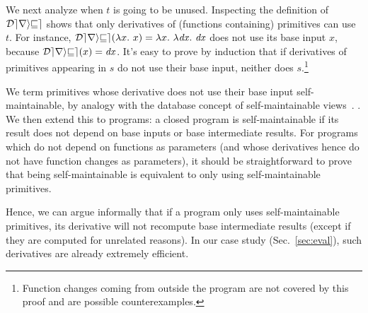 \begin{oldSec} %
We next analyze when $t$ is going to be unused.
Inspecting the definition of $\mathcal{Derive}$ shows that only derivatives of (functions
containing) primitives can use $t$. For instance,
$\Derive{\Lam{x}{x}} = \Lam{x}{\Lam{\D x}{\D x}}$ does not use its
base input $x$, because $\Derive{x} = \D x$.
It's easy to prove
by induction that if derivatives of primitives appearing in $s$
do not use their base input, neither does $s$.\footnote{Function
  changes coming from outside the program are not covered by this
  proof and are possible counterexamples.}

We term primitives whose derivative does not use their base input
self-maintainable, by analogy with the database concept of
self-maintainable views~\citep{Gupta99MMV}. . 
We then extend this to programs: a
closed program is self-maintainable if its result does not depend
on base inputs or base intermediate results.
%
For programs which do not depend on functions as parameters (and
whose derivatives hence do not have function changes as
parameters), it should be straightforward to prove that being
self-maintainable is equivalent to only using self-maintainable
primitives.

Hence, we can argue informally that if a program only uses
self-maintainable primitives, its derivative will not recompute
base intermediate results (except if they are computed for
unrelated reasons). In our case study (Sec.~\ref{sec:eval}),
such derivatives are already
extremely efficient.

\end{oldSec}
